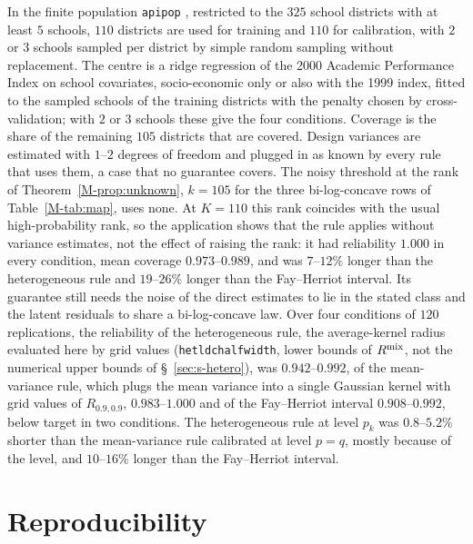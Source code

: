 \documentclass[11pt]{article}
\renewcommand{\_}{\usc\allowbreak}
\begin{document}
In the finite population \texttt{apipop} \citep{lumley2004}, restricted to the $325$ school districts with at least $5$ schools, $110$ districts are used for training and $110$ for calibration, with $2$ or $3$ schools sampled per district by simple random sampling without replacement. The centre is a ridge regression of the 2000 Academic Performance Index on school covariates, socio-economic only or also with the 1999 index, fitted to the sampled schools of the training districts with the penalty chosen by cross-validation; with $2$ or $3$ schools these give the four conditions. Coverage is the share of the remaining $105$ districts that are covered. Design variances are estimated with $1$--$2$ degrees of freedom and plugged in as known by every rule that uses them, a case that no guarantee covers. The noisy threshold at the rank of Theorem~\ref{M-prop:unknown}, $k = 105$ for the three bi-log-concave rows of Table~\ref{M-tab:map}, uses none. At $K = 110$ this rank coincides with the usual high-probability rank, so the application shows that the rule applies without variance estimates, not the effect of raising the rank: it had reliability $1.000$ in every condition, mean coverage $0.973$--$0.989$, and was $7$--$12\%$ longer than the heterogeneous rule and $19$--$26\%$ longer than the Fay--Herriot interval. Its guarantee still needs the noise of the direct estimates to lie in the stated class and the latent residuals to share a bi-log-concave law. Over four conditions of $120$ replications, the reliability of the heterogeneous rule, the average-kernel radius evaluated here by grid values (\texttt{hetldc\_halfwidth}, lower bounds of $R^{\rm mix}$, not the numerical upper bounds of \S~\ref{sec:s-hetero}), was $0.942$--$0.992$, of the mean-variance rule, which plugs the mean variance into a single Gaussian kernel with grid values of $R_{0.9,0.9}$, $0.983$--$1.000$ and of the Fay--Herriot interval $0.908$--$0.992$, below target in two conditions. The heterogeneous rule at level $p_k$ was $0.8$--$5.2\%$ shorter than the mean-variance rule calibrated at level $p = q$, mostly because of the level, and $10$--$16\%$ longer than the Fay--Herriot interval.

\section{Reproducibility}\label{sec:s-code}
\end{document}
